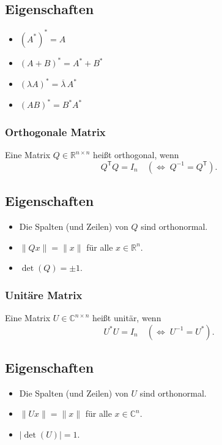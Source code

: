 \documentclass[9pt,a4paper]{article}
\begin{document}
    \subsection*{Eigenschaften}
    \begin{itemize}
        \item $(A^{\mathsf *})^{\mathsf *} = A$
        \item $(A+B)^{\mathsf *} = A^{\mathsf *} + B^{\mathsf *}$
        \item $(\lambda A)^{\mathsf *} = \overline{\lambda}\, A^{\mathsf *}$
        \item $(AB)^{\mathsf *} = B^{\mathsf *} A^{\mathsf *}$
    \end{itemize}
    
    \subsubsection*{Orthogonale Matrix}
    
    Eine Matrix $Q \in \mathbb{R}^{n\times n}$ heißt orthogonal, wenn
    \[
    Q^{\mathsf T} Q = I_n
    \quad (\Leftrightarrow\; Q^{-1} = Q^{\mathsf T}).
    \]
    
    \subsection*{Eigenschaften}
    \begin{itemize}
        \item Die Spalten (und Zeilen) von $Q$ sind orthonormal.
        \item $\|Qx\| = \|x\|$ für alle $x \in \mathbb{R}^n$.
        \item $\det(Q) = \pm 1$.
    \end{itemize}
    
    \subsubsection*{Unitäre Matrix}
    
    Eine Matrix $U \in \mathbb{C}^{n\times n}$ heißt unitär, wenn
    \[
    U^{\mathsf *} U = I_n
    \quad (\Leftrightarrow\; U^{-1} = U^{\mathsf *}).
    \]
    
    \subsection*{Eigenschaften}
    \begin{itemize}
        \item Die Spalten (und Zeilen) von $U$ sind orthonormal.
        \item $\|Ux\| = \|x\|$ für alle $x \in \mathbb{C}^n$.
        \item $|\det(U)| = 1$.
    \end{itemize}
    
\end{document}
